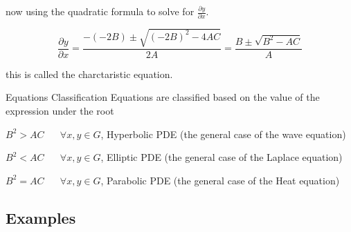 \documentclass[]{article}
\begin{document}
now using the quadratic formula to solve for $\frac{\partial y}{\partial x}$.

\[
    \frac{\partial y}{\partial x} = \frac{-\left(-2B\right)\pm\sqrt{{(-2B)}^2 -4AC}}{2A} = \frac{B\pm\sqrt{B^2 -AC}}{A}    
\]

this is called the charctaristic equation.

\begin{enrichment*}{Equations Classification}
Equations are classified based on the value of the expression under the root

$B^2 > AC \;\;\;\;\;\; \forall x,y\in G$, Hyperbolic PDE (the general case of the wave equation) 

$B^2 < AC \;\;\;\;\;\; \forall x,y\in G$, Elliptic PDE (the general case of the Laplace equation) 

$B^2 = AC \;\;\;\;\;\; \forall x,y\in G$, Parabolic PDE (the general case of the Heat equation) 
\end{enrichment*}


\subsection{Examples}
\end{document}
